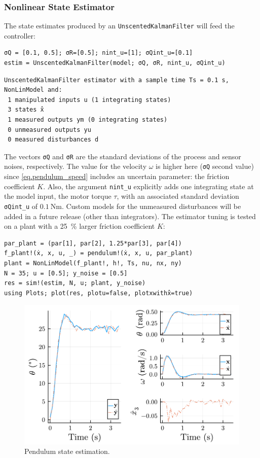 \subsubsection{Nonlinear State Estimator}

The state estimates produced by an \texttt{UnscentedKalmanFilter} will feed the controller:
\begin{verbatim}
σQ = [0.1, 0.5]; σR=[0.5]; nint_u=[1]; σQint_u=[0.1]
estim = UnscentedKalmanFilter(model; σQ, σR, nint_u, σQint_u)
\end{verbatim}
\spacerepl
\begin{verbatim}
UnscentedKalmanFilter estimator with a sample time Ts = 0.1 s, 
NonLinModel and:
 1 manipulated inputs u (1 integrating states)
 3 states x̂
 1 measured outputs ym (0 integrating states)
 0 unmeasured outputs yu
 0 measured disturbances d
\end{verbatim}
The vectors \texttt{σQ} and \texttt{σR} are the standard deviations of the process and sensor noises, respectively. The value for the velocity $\omega$ is higher here (\texttt{σQ} second value) since \eqref{eq.pendulum_speed} includes an uncertain parameter: the friction coefficient $K$. Also, the argument \texttt{nint\_u} explicitly adds one integrating state at the model input, the motor torque $\tau$, with an associated standard deviation \texttt{σQint\_u} of $\SI{0.1}{\newton\meter}$. Custom models for the unmeasured disturbances will be added in a future release (other than integrators). The estimator tuning is tested on a plant with a \SI{25}{\percent} larger friction coefficient $K$: 
\begin{verbatim}
par_plant = (par[1], par[2], 1.25*par[3], par[4])
f_plant!(ẋ, x, u, _) = pendulum!(ẋ, x, u, par_plant)
plant = NonLinModel(f_plant!, h!, Ts, nu, nx, ny)
N = 35; u = [0.5]; y_noise = [0.5]
res = sim!(estim, N, u; plant, y_noise)
using Plots; plot(res, plotu=false, plotxwithx̂=true)
\end{verbatim}

\begin{figure}[h]
    \centering
    \includegraphics[width=\columnwidth]{fig/plot_NonLinMPC1.pdf}
    \caption{Pendulum state estimation.}
    \label{fig:plot_NonLinMPC1}
\end{figure}

